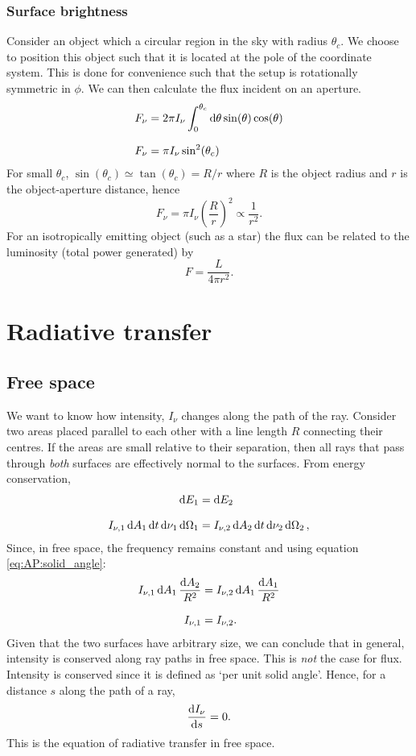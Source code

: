 \subsubsection{Surface brightness}
Consider an object which a circular region in the sky with radius \(\theta_c\).
 We choose to position this object such that it is located at the pole of the coordinate system.
 This is done for convenience such that the setup is rotationally symmetric in \(\phi\).
 We can then calculate the flux incident on an aperture.
%
\begin{align*}
	F_\nu &= 2\pi I_\nu \int_{0}^{\theta_c}\diff\theta \sin(\theta) \cos(\theta)
	\linedrop
	F_\nu &= \pi I_\nu \sin^2(\theta_c)
\end{align*}
%
For small \(\theta_c\), \(\sin(\theta_c) \simeq \tan(\theta_c) = R/r\) where \(R\) is the object radius and \(r\) is the object-aperture distance, hence
%
\begin{equation}
	F_\nu = \pi I_\nu  \left( \frac{R}{r} \right) ^2 \propto \frac{1}{r^2}.
	\label{eq:AP:flux}
\end{equation}
%
For an isotropically emitting object (such as a star) the flux can be related to the luminosity (total power generated) by
%
\[F = \frac{L}{4\pi r^2}.\]
%
%
%
\section{Radiative transfer}
\subsection{Free space}
We want to know how intensity, \(I_\nu\) changes along the path of the ray.
 Consider two areas placed parallel to each other with a line length \(R\) connecting their centres.
 If the areas are small relative to their separation, then all rays that pass through \emph{both} surfaces are effectively normal to the surfaces.
 From energy conservation,
\begin{align*}
	\dd{E_1} &= \dd{E_2}
	\linedrop
	I_{\nu ,1} \dd{A_1} \dd{t} \dd{\nu_1} \dd{\Omega_1} &= I_{\nu ,2} \dd{A_2} \dd{t} \dd{\nu_2} \dd{\Omega_2} ,	
\end{align*}
%
Since, in free space, the frequency remains constant and using equation \ref{eq:AP:solid_angle}:
%
\begin{align*}
		I_{\nu ,1} \dd{A_1} \frac{\dd{A_2}}{R^2} &= I_{\nu ,2} \dd{A_1} \frac{\dd{A_1}}{R^2}
		\linedrop
		I_{\nu ,1} &= I_{\nu ,2}.
\end{align*}
%
Given that the two surfaces have arbitrary size, we can conclude that in general, intensity is conserved along ray paths in free space.
 This is \emph{not} the case for flux.
 Intensity is conserved since it is defined as `per unit solid angle'.
 Hence, for a distance \(s\) along the path of a ray,
%
\[\dv{I_\nu}{s} = 0.\]
%
This is the equation of radiative transfer in free space.
%
%

